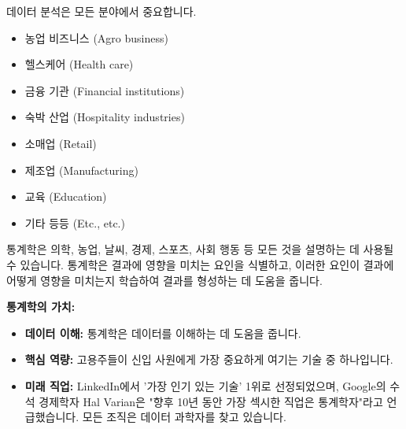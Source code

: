 \documentclass[11pt,a4paper]{article}
\theoremstyle{definition}
\begin{document}
\begin{tcolorbox}[title={데이터 분석의 중요성}, colback=white, colframe=black!20!white]
데이터 분석은 모든 분야에서 중요합니다.
\begin{itemize}
    \item 농업 비즈니스 (Agro business)
    \item 헬스케어 (Health care)
    \item 금융 기관 (Financial institutions)
    \item 숙박 산업 (Hospitality industries)
    \item 소매업 (Retail)
    \item 제조업 (Manufacturing)
    \item 교육 (Education)
    \item 기타 등등 (Etc., etc.)
\end{itemize}
통계학은 의학, 농업, 날씨, 경제, 스포츠, 사회 행동 등 모든 것을 설명하는 데 사용될 수 있습니다. 통계학은 결과에 영향을 미치는 요인을 식별하고, 이러한 요인이 결과에 어떻게 영향을 미치는지 학습하여 결과를 형성하는 데 도움을 줍니다.
\end{tcolorbox}

\begin{summarybox}
\textbf{통계학의 가치:}
\begin{itemize}
    \item \textbf{데이터 이해:} 통계학은 데이터를 이해하는 데 도움을 줍니다.
    \item \textbf{핵심 역량:} 고용주들이 신입 사원에게 가장 중요하게 여기는 기술 중 하나입니다.
    \item \textbf{미래 직업:} LinkedIn에서 '가장 인기 있는 기술' 1위로 선정되었으며, Google의 수석 경제학자 Hal Varian은 "향후 10년 동안 가장 섹시한 직업은 통계학자"라고 언급했습니다. 모든 조직은 데이터 과학자를 찾고 있습니다.
\end{itemize}
\end{summarybox}
\end{document}
